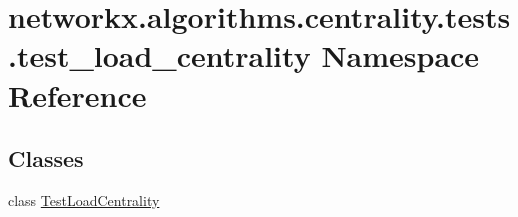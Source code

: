 \hypertarget{namespacenetworkx_1_1algorithms_1_1centrality_1_1tests_1_1test__load__centrality}{}\section{networkx.\+algorithms.\+centrality.\+tests.\+test\+\_\+load\+\_\+centrality Namespace Reference}
\label{namespacenetworkx_1_1algorithms_1_1centrality_1_1tests_1_1test__load__centrality}
\subsection*{Classes}
\begin{DoxyCompactItemize}
\item 
class \hyperlink{classnetworkx_1_1algorithms_1_1centrality_1_1tests_1_1test__load__centrality_1_1TestLoadCentrality}{Test\+Load\+Centrality}
\end{DoxyCompactItemize}
